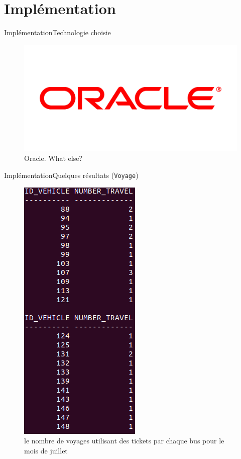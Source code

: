 \documentclass[a4paper,12pt,usenames,dvipsnames]{beamer}
\begin{document}
\section{Implémentation}
\begin{frame}{Implémentation}{Technologie choisie}
\begin{figure}[!ht]
  \centering
  \includegraphics[scale=0.2]{images/Oracle.png}
  \caption{Oracle. What else?}
\end{figure}
\end{frame}

\begin{frame}{Implémentation}{Quelques résultats (\texttt{Voyage})}
  \begin{figure}[!ht]
    \centering
    \includegraphics[scale=0.3]{images/requetes_analytiques/requ1.png}
    \caption{le nombre de voyages utilisant des tickets par chaque bus pour le mois de juillet}
  \end{figure}
\end{frame}
\end{document}
